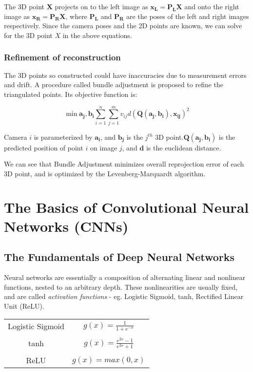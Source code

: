 The 3D point $\mathbf{X}$ projects on to the left image as $\mathbf{x_L} = \mathbf{P_LX}$ and onto the right image as $\mathbf{x_R} = \mathbf{P_RX}$, where $\mathbf{P_L}$ and $\mathbf{P_R}$ are the poses of the left and right images respectively. Since the camera poses and the 2D points are known, we can solve for the 3D point $X$ in the above equations. 

\subsubsection{Refinement of reconstruction}
The 3D points so constructed could have inaccuracies due to measurement errors and drift. A procedure called bundle adjustment is proposed to refine the triangulated points. Its objective function is:

\[\min{\mathbf{a_j,b_i}} \sum_{i=1}^{n} \sum_{j=1}^{m} v_{ij}d(\mathbf{Q(a_j, b_i), x_{ij}})^2\]

Camera $i$ is parameterized by $\mathbf{a_i}$, and $\mathbf{b_j}$ is the $j^{th}$ 3D point.$\mathbf{Q(a_j, b_i)}$ is the predicted position of point $i$ on image $j$, and $\mathbf{d}$ is the euclidean distance.

We can see that Bundle Adjustment minimizes overall reprojection error of each 3D point, and is optimized by the Levenberg-Marquardt algorithm.

\section{The Basics of Convolutional Neural Networks (CNNs)}
\subsection{The Fundamentals of Deep Neural Networks}
Neural networks are essentially a composition of alternating linear and nonlinear functions, nested to an arbitrary depth. These nonlinearities are usually fixed, and are called \emph{activation functions} - eg. Logistic Sigmoid, tanh, Rectified Linear Unit (ReLU). 

\begin{center}
	\begin{tabular}{ |c|c| } 
		\hline
		Logistic Sigmoid & $g(x) = \frac{1}{1 + e^{-x}}$ \\\\
		tanh & $g(x) = \frac{e^{2x} - 1}{e^{2x} + 1}$ \\\\
		ReLU & $g(x)= max(0, x)$ \\ 
		\hline
	\end{tabular}
\end{center}


